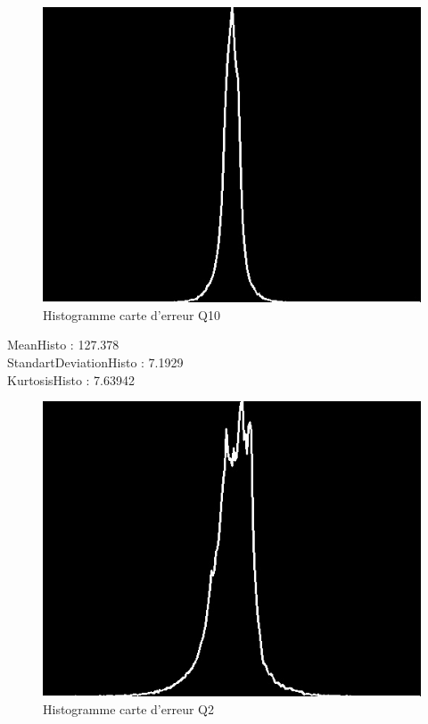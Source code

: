 \documentclass[12pt]{report}
\begin{document}
\begin{figure}[H]
\begin{center}
\includegraphics[scale=0.5]{../ImageRes/hist_disto_2.jpg} 
\caption{Histogramme carte d'erreur Q10 }
\end{center}
\end{figure}

\begin{center}
MeanHisto : 127.378\\
StandartDeviationHisto : 7.1929\\
KurtosisHisto : 7.63942
\end{center}

\begin{figure}[H]
\begin{center}
\includegraphics[scale=0.5]{../ImageRes/hist_disto_3.jpg} 
\caption{Histogramme carte d'erreur Q2 }
\end{center}
\end{figure}
\end{document}
